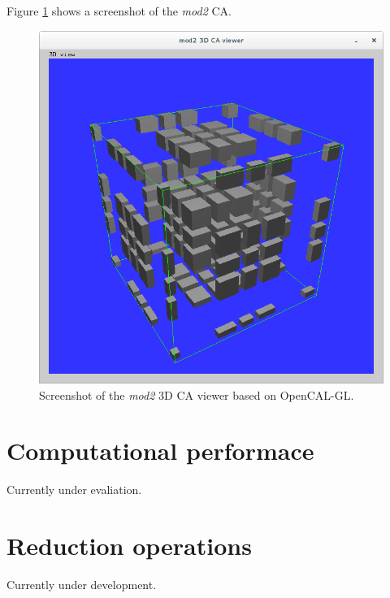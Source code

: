 Figure \ref{fig:calgl_mod2} shows a screenshot of the \emph{mod2} CA.

\begin{figure}
  \begin{center}
    \includegraphics[width=12cm]{./images/OpenCAL/calgl_mod2}
    \caption{Screenshot of the \emph{mod2} 3D CA viewer based on
      OpenCAL-GL.}
    \label{fig:calgl_mod2}
  \end{center}
\end{figure}


\section{Computational performace}
Currently under evaliation.


\section{Reduction operations}
Currently under development.
